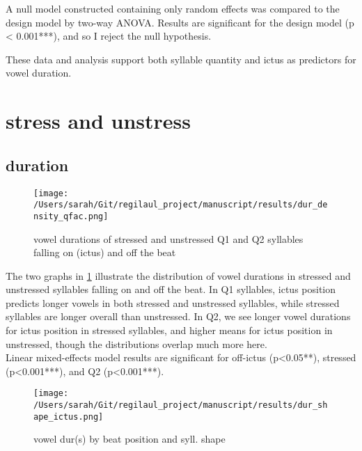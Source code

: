  
A null model constructed containing only random effects was compared to the design model by two-way ANOVA. Results are significant for the design model (p < 0.001***), and so I reject the null hypothesis. 

These data and analysis support both syllable quantity and ictus as predictors for vowel duration. 



%
%
%
%
\section{stress and unstress}


\subsection{duration}

\begin{figure}[htbp]
\centering
\texttt{[image: /Users/sarah/Git/regilaul\_project/manuscript/results/dur\_density\_qfac.png]}
\caption{vowel durations of stressed and unstressed Q1 and Q2 syllables falling on (ictus) and off the beat}
\label{durstrick}
\end{figure}

The two graphs in \ref{durstrick} illustrate the distribution of vowel durations in stressed and unstressed syllables falling on and off the beat. In Q1 syllables, ictus position predicts longer vowels in both stressed and unstressed syllables, while stressed syllables are longer overall than unstressed. In Q2, we see longer vowel durations for ictus position in stressed syllables, and higher means for ictus position in unstressed, though the distributions overlap much more here. \\

Linear mixed-effects model results are significant for off-ictus (p<0.05**), stressed (p<0.001***), and Q2 (p<0.001***). 

\begin{figure}[htpb]
\centering
\texttt{[image: /Users/sarah/Git/regilaul\_project/manuscript/results/dur\_shape\_ictus.png]}
\caption{vowel dur(s) by beat position and syll. shape}
\label{ickdursh}
\end{figure}

